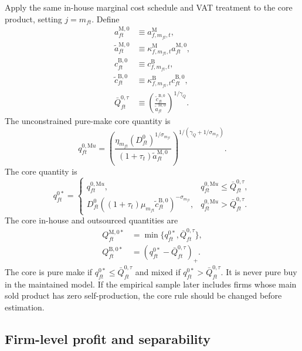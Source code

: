 \documentclass[11pt,a4paper]{article}
\newcommand{\M}{\mathrm{M}}
\newcommand{\B}{\mathrm{B}}
\begin{document}
Apply the same in-house marginal cost schedule and VAT treatment to the core product, setting $j=m_{ft}$. Define
\begin{align}
    a^{\M,0}_{ft}&\equiv a^{\M}_{f,m_{ft},t},\\
    \widetilde a^{\M,0}_{ft}&\equiv \kappa^{\M}_{f,m_{ft},t}a^{\M,0}_{ft},\\
    c^{\B,0}_{ft}&\equiv c^{\B}_{f,m_{ft},t},\\
    \widetilde c^{\B,0}_{ft}&\equiv \kappa^{\B}_{f,m_{ft},t}c^{\B,0}_{ft},\\
    \bar Q^{0,\tau}_{ft}&\equiv\left(\frac{\widetilde c^{\B,0}_{ft}}{\widetilde a^{\M,0}_{ft}}\right)^{1/\gamma_Q}.
\end{align}
The unconstrained pure-make core quantity is
\begin{equation}
    q^{0,\M u}_{ft}
    =\left(
        \frac{\eta_{m_{ft}}(D^0_{ft})^{1/\sigma_{m_{ft}}}}
             {(1+\tau_t)\widetilde a^{\M,0}_{ft}}
      \right)^{1/(\gamma_Q+1/\sigma_{m_{ft}})}.
    \label{eq:core_qMu}
\end{equation}
The core quantity is
\begin{equation}
    q^{0*}_{ft}= 
    \begin{cases}
        q^{0,\M u}_{ft}, & q^{0,\M u}_{ft}\leq\bar Q^{0,\tau}_{ft},\\[0.3em]
        D^0_{ft}\left((1+\tau_t)\mu_{m_{ft}}\widetilde c^{\B,0}_{ft}\right)^{-\sigma_{m_{ft}}}, & q^{0,\M u}_{ft}>\bar Q^{0,\tau}_{ft}.
    \end{cases}
    \label{eq:core_qstar}
\end{equation}
The core in-house and outsourced quantities are
\begin{align}
    Q^{\M,0*}_{ft}&=\min\{q^{0*}_{ft},\bar Q^{0,\tau}_{ft}\},\\
    Q^{\B,0*}_{ft}&=(q^{0*}_{ft}-\bar Q^{0,\tau}_{ft})_+.
\end{align}
The core is pure make if $q^{0*}_{ft}\leq\bar Q^{0,\tau}_{ft}$ and mixed if $q^{0*}_{ft}>\bar Q^{0,\tau}_{ft}$. It is never pure buy in the maintained model. If the empirical sample later includes firms whose main sold product has zero self-production, the core rule should be changed before estimation.

\subsection{Firm-level profit and separability}
\end{document}

